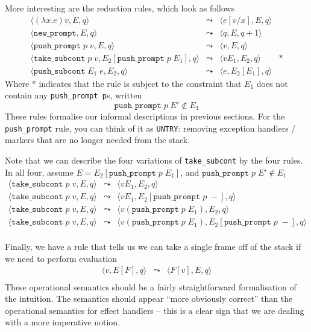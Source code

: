 More interesting are the reduction rules, which look as follows
\[\begin{array}{lcll}
    \langle (\lambda x. e) v, E, q \rangle & \leadsto & \langle e[v/x], E, q \rangle \\
    \langle \texttt{new\_prompt}, E, q \rangle & \leadsto & \langle q, E, q+1 \rangle \\ 
    \langle \texttt{push\_prompt} \; p \; v, E, q \rangle & \leadsto & \langle v, E, q \rangle \\ 
    \langle \texttt{take\_subcont} \; p \; v, E_2 [\texttt{push\_prompt} \; p \; E_1], q \rangle & \leadsto & \langle v E_1, E_2, q \rangle & * \\ 
    \langle \texttt{push\_subcont} \; E_1 \; e, E_2, q \rangle & \leadsto & \langle e, E_2[E_1], q \rangle 
\end{array}\]
Where $*$ indicates that the rule is subject to the constraint that $E_1$ does not contain any \texttt{push\_prompt p}s, written 
\[\texttt{push\_prompt} \; p \; E' \notin E_1\]
These rules formalise our informal descriptions in previous sections. For the \texttt{push\_prompt} rule, you can think of it as \texttt{UNTRY}: removing exception handlers / markers that are no longer needed from the stack.

Note that we can describe the four variations of \texttt{take\_subcont} by the four rules. In all four, assume $E = E_2 [\texttt{push\_prompt} \; p \; E_1]$, and $\texttt{push\_prompt} \; p \; E' \notin E_1$
\[\begin{array}{lcl}
     \langle \texttt{take\_subcont} \; p \; v, E, q \rangle & \leadsto & \langle v E_1, E_2, q \rangle\\
     \langle \texttt{take\_subcont} \; p \; v, E, q \rangle & \leadsto & \langle v E_1, E_2[\texttt{push\_prompt} \; p \; -], q \rangle\\
     \langle \texttt{take\_subcont} \; p \; v, E, q \rangle & \leadsto & \langle v (\texttt{push\_prompt} \; p \; E_1), E_2, q \rangle\\
     \langle \texttt{take\_subcont} \; p \; v, E, q \rangle & \leadsto & \langle v (\texttt{push\_prompt} \; p \; E_1), E_2[\texttt{push\_prompt} \; p \; -], q \rangle\\

\end{array}\]

Finally, we have a rule that tells us we can take a single frame off of the stack if we need to perform evaluation
\[\begin{array}{lcl}
    \langle v, E[F], q \rangle & \leadsto & \langle F[v], E, q \rangle \\
\end{array}\]
These operational semantics should be a fairly straightforward formalisation of the intuition. The semantics should appear ``more obviously correct'' than the operational semantics for effect handlers -- this is a clear sign that we are dealing with a more imperative notion. 

